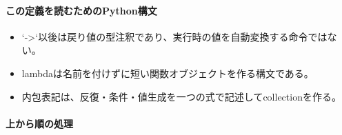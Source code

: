 \documentclass[a4paper,11pt]{article}
\begin{document}
            \paragraph{この定義を読むためのPython構文}
            \begin{itemize}[leftmargin=1.6em]
            \item `->`以後は戻り値の型注釈であり、実行時の値を自動変換する命令ではない。
\item lambdaは名前を付けずに短い関数オブジェクトを作る構文である。
\item 内包表記は、反復・条件・値生成を一つの式で記述してcollectionを作る。
            \end{itemize}
            \paragraph{上から順の処理}
\end{document}
